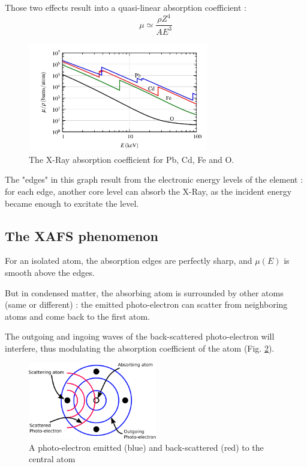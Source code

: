 \documentclass[11pt,a4paper,oneside]{report}
\begin{document}
Those two effects result into a quasi-linear absorption coefficient :
\[\mu \simeq \frac{\rho Z^4}{A E^3}\]
\begin{figure}[H]
    \begin{center}
        \includegraphics[width=0.7\textwidth]{Images/AbsorptionCoeff}
        \caption{The X-Ray absorption coefficient for Pb, Cd, Fe and O.}
        \label{absorptionCoeff}
    \end{center}
\end{figure}

The "edges" in this graph result from the electronic energy levels of the element : for each edge, another core level can absorb the X-Ray, as the incident energy became enough to excitate the level.

\newpage
\subsection{The XAFS phenomenon}
For an isolated atom, the absorption edges are perfectly sharp, and $\mu(E)$ is smooth above the edges.

But in condensed matter, the absorbing atom is surrounded by other atoms (same or different) : the emitted photo-electron can scatter from neighboring atoms and come back to the first atom.

The outgoing and ingoing waves of the back-scattered photo-electron will interfere, thus modulating the absorption coefficient of the atom (Fig. \ref{scatteringschema}).
\begin{figure}[H]
    \begin{center}
        \includegraphics[width=0.5\textwidth]{Images/Scattering}
        \caption{A photo-electron emitted (blue) and back-scattered (red) to the central atom}
        \label{scatteringschema}
    \end{center}
\end{figure}
\end{document}
